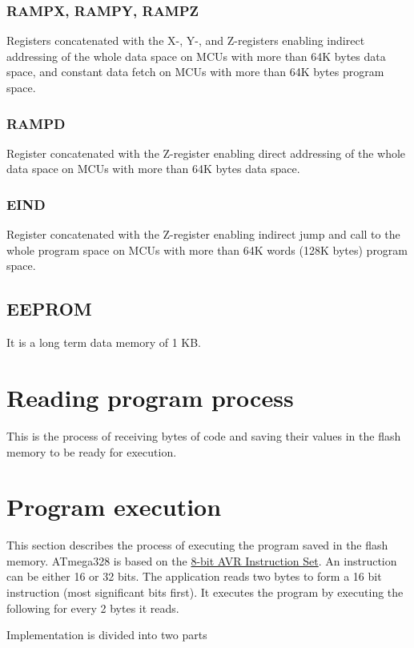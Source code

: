 \subsubsection{RAMPX, RAMPY, RAMPZ}
Registers concatenated with the X-, Y-, and Z-registers enabling indirect addressing of the whole data space on MCUs with more than 64K bytes data space, and constant data fetch on MCUs with more than 64K bytes program space. 
				
\subsubsection{RAMPD}
Register concatenated with the Z-register enabling direct addressing of the whole data space on MCUs with more than 64K bytes data space. 
	
\subsubsection{EIND}
Register concatenated with the Z-register enabling indirect jump and call to the whole program space on MCUs with more than 64K words (128K bytes) program space. 
				
\subsection{EEPROM}
It is a long term data memory of 1 KB.


\section{Reading program process}
This is the process of receiving bytes of code and saving their values in the flash memory to be ready for execution.

\section{Program execution}

This section describes the process of executing the program saved in the flash memory. ATmega328 is based on the \href{http://www.atmel.com/images/doc0856.pdf}{8-bit AVR Instruction Set}. An instruction can be either 16 or 32 bits. The application reads two bytes to form a 16 bit instruction (most significant bits first). It executes the program by executing the following for every 2 bytes it reads. 

\noindent Implementation is divided into two parts

